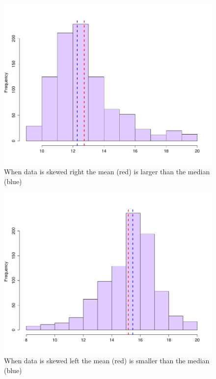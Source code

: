 \begin{figure}[H]
\begin{center}
	\includegraphics[scale=0.35]{Section2/skew_right.pdf}
\caption{When data is skewed right the mean (red) is larger than the median (blue) }
\end{center}
\end{figure}

\begin{figure}[H]
\begin{center}
	\includegraphics[scale=0.35]{Section2/skew_left.pdf}
\caption{When data is skewed left the mean (red) is smaller than the median (blue) }
\end{center}
\end{figure}

